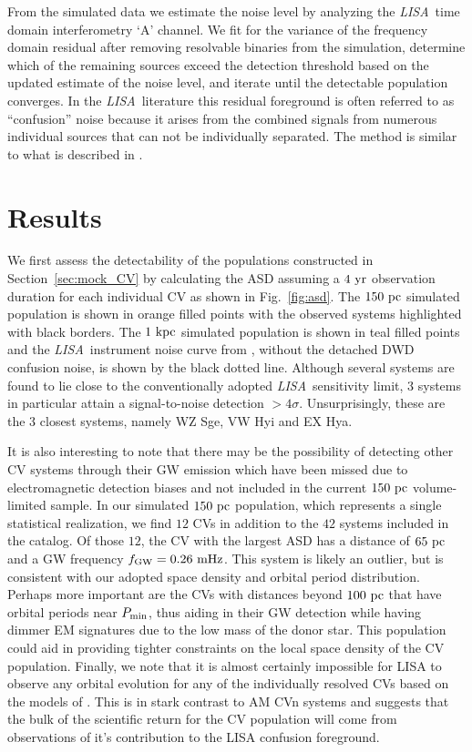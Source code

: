 \documentclass[fleqn,usenatbib]{mnras}
\newcommand{\lisa}{{\it LISA}}
\begin{document}
From the simulated data we estimate the noise level by analyzing the \lisa\ time domain interferometry `A' channel. We fit for the variance of the frequency domain residual after removing resolvable binaries from the simulation, determine which of the remaining sources exceed the detection threshold based on the updated estimate of the noise level, and iterate until the detectable population converges. In the \lisa\ literature this residual foreground is often referred to as ``confusion'' noise because it arises from the combined signals from numerous individual sources that can not be individually separated. The method is similar to what is described in \cite{2021PhRvD.104d3019K}. 



\section{Results}
We first assess the detectability of the populations constructed in Section~\ref{sec:mock_CV} by calculating the ASD assuming a $4~\rm{yr}$ observation duration for each individual CV as shown in Fig.~\ref{fig:asd}. The $150~\rm{pc}$ simulated population is shown in orange filled points with the observed \citet{pala20} systems highlighted with black borders. The $1~\rm{kpc}$ simulated population is shown in teal filled points and the \lisa\ instrument noise curve from \citet{Robson2019}, without the detached DWD confusion noise, is shown by the black dotted line. Although several systems are found to lie close to the conventionally adopted \lisa\ sensitivity limit, 3 systems in particular attain a signal-to-noise detection $>4\sigma$. Unsurprisingly, these are the 3 closest systems, namely WZ Sge, VW Hyi and EX Hya. 

It is also interesting to note that there may be the possibility of detecting other CV systems through their GW emission which have been missed due to electromagnetic detection biases and not included in the current $150~\rm{pc}$ volume-limited sample. In our simulated $150~\rm{pc}$ population, which represents a single statistical realization, we find $12$ CVs in addition to the $42$ systems included in the \citet{pala20} catalog. Of those $12$, the CV with the largest ASD has a distance of $65~\rm{pc}$ and a GW frequency $f_{\rm{GW}} = 0.26~\rm{mHz}$. This system is likely an outlier, but is consistent with our adopted space density and orbital period distribution. Perhaps more important are the CVs with distances beyond $100~\rm{pc}$ that have orbital periods near $P_{\rm{min}}$, thus aiding in their GW detection while having dimmer EM signatures due to the low mass of the donor star. This population could aid in providing tighter constraints on the local space density of the CV population. Finally, we note that it is almost certainly impossible for LISA to observe any orbital evolution for any of the individually resolved CVs based on the models of \citet{knigge11}. This is in stark contrast to AM CVn systems \citep[e.g.][]{Nelemans2004, Kremer2017, Breivik2018} and suggests that the bulk of the scientific return for the CV population will come from observations of it's contribution to the LISA confusion foreground. 
\end{document}
